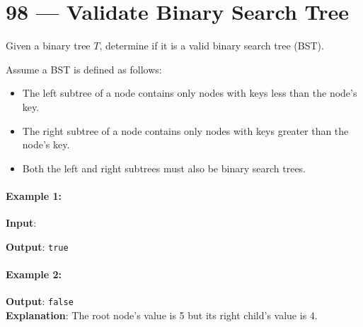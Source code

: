 \section{98 --- Validate Binary Search Tree}
Given a binary tree $T$, determine if it is a valid binary search tree (BST).
\par
Assume a BST is defined as follows:
\begin{itemize}
\item The left subtree of a node contains only nodes with keys less than the node's key.
\item The right subtree of a node contains only nodes with keys greater than the node's key.
\item Both the left and right subtrees must also be binary search trees.
\end{itemize}
\paragraph{Example 1:}
\begin{flushleft}
\textbf{Input}:
\begin{figure}[H]
\end{figure}
\textbf{Output}: \texttt{true}
\end{flushleft}
\paragraph{Example 2:}
\begin{flushleft}
\begin{figure}[H]
\end{figure}
\textbf{Output}: \texttt{false}
\\
\textbf{Explanation}: The root node's value is 5 but its right child's value is 4.
\end{flushleft}
